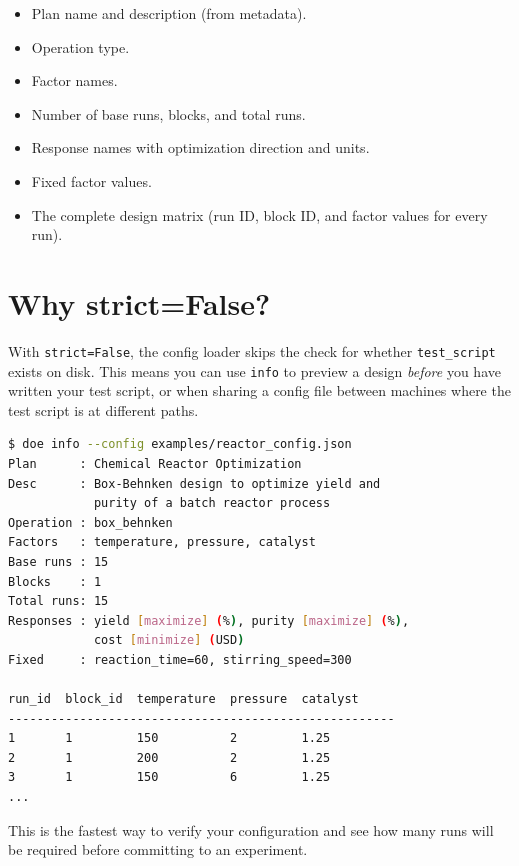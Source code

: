 \documentclass[11pt]{book}
\begin{document}
\begin{itemize}
  \item Plan name and description (from metadata).
  \item Operation type.
  \item Factor names.
  \item Number of base runs, blocks, and total runs.
  \item Response names with optimization direction and units.
  \item Fixed factor values.
  \item The complete design matrix (run ID, block ID, and factor values for every run).
\end{itemize}

\section{Why strict=False?}

With \texttt{strict=False}, the config loader skips the check for whether \texttt{test\_script} exists on disk. This means you can use \texttt{info} to preview a design \emph{before} you have written your test script, or when sharing a config file between machines where the test script is at different paths.

\begin{example}
\begin{lstlisting}[language=bash]
$ doe info --config examples/reactor_config.json
Plan      : Chemical Reactor Optimization
Desc      : Box-Behnken design to optimize yield and
            purity of a batch reactor process
Operation : box_behnken
Factors   : temperature, pressure, catalyst
Base runs : 15
Blocks    : 1
Total runs: 15
Responses : yield [maximize] (%), purity [maximize] (%),
            cost [minimize] (USD)
Fixed     : reaction_time=60, stirring_speed=300

run_id  block_id  temperature  pressure  catalyst
------------------------------------------------------
1       1         150          2         1.25
2       1         200          2         1.25
3       1         150          6         1.25
...
\end{lstlisting}
\end{example}

This is the fastest way to verify your configuration and see how many runs will be required before committing to an experiment.


\end{document}
